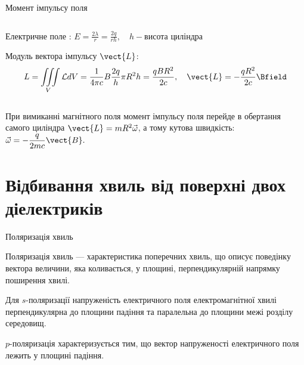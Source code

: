 \documentclass[onlytextwidth]{beamer}
\begin{document}
\begin{frame}{Момент імпульсу поля}{}
\begin{columns}
\begin{column}{0.75\linewidth}
\begin{block}{}
				Електричне поле :
				\(\displaystyle
				E = \frac{2\lambda}{r} = \frac{2q}{rh}, \quad h - \text{висота циліндра}
				\)

				Модуль вектора імпульсу $ \vect{L} $:
				\begin{equation*}
					L = \iiint\limits_V\mathcal{L} dV = \frac{1}{4\pi c} B \frac{2q}{h} \pi R^2 h = \frac{qBR^2}{2c}, \quad \vect{L} = - \frac{qR^2}{2c}
					\Bfield
				\end{equation*}
			\end{block}
		\end{column}
	\end{columns}
	\begin{block}{}\justifying
		При вимиканні магнітного поля момент імпульсу поля перейде в обертання самого циліндра $ \vect{L} = mR^2\vec\omega
		$, а тому кутова швидкість:
		\(
		\displaystyle	\vec{\omega} = -\frac{q}{2mc}\vect{B}.
		\)
	\end{block}
\end{frame}


\section{Відбивання хвиль від поверхні двох діелектриків}

\begin{frame}{Поляризація хвиль}{}
	\begin{block}{}\justifying
		\alert{Поляризація хвиль} --- характеристика поперечних хвиль, що описує поведінку вектора величини, яка коливається, у площині, перпендикулярній
		напрямку поширення хвилі.
	\end{block}
	\begin{block}{}\justifying
		Для \alert{$s$-поляризації} напруженість електричного поля електромагнітної хвилі перпендикулярна до площини падіння та паралельна до площини межі
		розділу середовищ.
	\end{block}
	\begin{block}{}\justifying
		\alert{$p$-поляризація} характеризується тим, що
		вектор напруженості електричного поля лежить у площині падіння.
	\end{block}
\end{frame}
\end{document}
